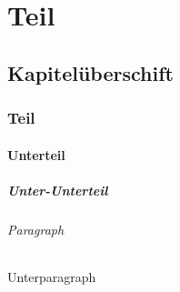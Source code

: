 \documentclass[10pt,a4paper]{report}
\begin{document}

\tableofcontents
\newpage
\listoffigures
\newpage
\listoftables
\newpage
{}

\part{Teil}
\chapter{Kapitelüberschift}
\section{Teil}
\subsection{Unterteil}
\subsubsection{Unter-Unterteil}
\paragraph{Paragraph}
\subparagraph{Unterparagraph}










\end{document}

